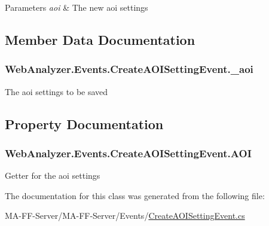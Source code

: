 \begin{DoxyParams}{Parameters}
{\em aoi} & The new aoi settings\\
\hline
\end{DoxyParams}


\subsection{Member Data Documentation}
\hypertarget{class_web_analyzer_1_1_events_1_1_create_a_o_i_setting_event_a4053962220f0a13a10049ea4cefeb61d}{}
\subsubsection[{\+\_\+aoi}]{ Web\+Analyzer.\+Events.\+Create\+A\+O\+I\+Setting\+Event.\+\_\+aoi\hspace{0.3cm}{\ttfamily [private]}}\label{class_web_analyzer_1_1_events_1_1_create_a_o_i_setting_event_a4053962220f0a13a10049ea4cefeb61d}


The aoi settings to be saved 



\subsection{Property Documentation}
\hypertarget{class_web_analyzer_1_1_events_1_1_create_a_o_i_setting_event_a9fd4a39178dd304567bc8439d90a4b32}{}
\subsubsection[{A\+O\+I}]{ Web\+Analyzer.\+Events.\+Create\+A\+O\+I\+Setting\+Event.\+A\+O\+I\hspace{0.3cm}{\ttfamily [get]}}\label{class_web_analyzer_1_1_events_1_1_create_a_o_i_setting_event_a9fd4a39178dd304567bc8439d90a4b32}


Getter for the aoi settings 



The documentation for this class was generated from the following file\+:\begin{DoxyCompactItemize}
\item 
M\+A-\/\+F\+F-\/\+Server/\+M\+A-\/\+F\+F-\/\+Server/\+Events/\hyperlink{_create_a_o_i_setting_event_8cs}{Create\+A\+O\+I\+Setting\+Event.\+cs}\end{DoxyCompactItemize}

